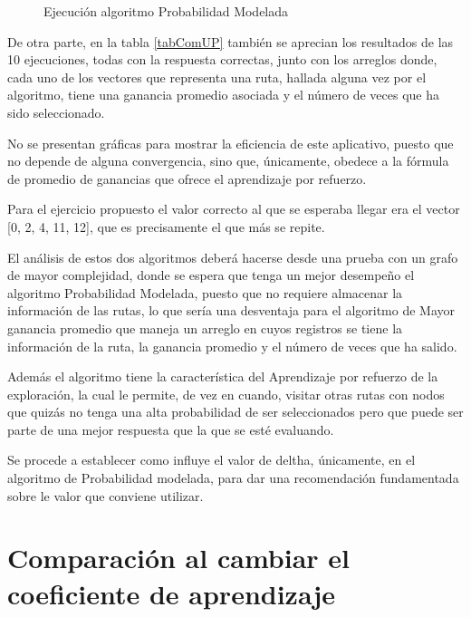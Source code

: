 \begin{figure}
\begin{subfigure}[b]{0.39\textwidth}
        \label{fig:tiger}
    \end{subfigure}    
    \caption{Ejecución algoritmo Probabilidad Modelada}\label{fig:grafi}
\end{figure}

De otra parte, en la tabla \ref{tabComUP} también se aprecian los resultados de las 10 ejecuciones, todas con la respuesta correctas, junto con los arreglos donde, cada uno de los vectores que representa una ruta, hallada alguna vez por el algoritmo, tiene una ganancia promedio asociada y el número de veces que ha sido seleccionado.

No se presentan gráficas para mostrar la eficiencia de este aplicativo, puesto que no depende de alguna convergencia, sino que, únicamente, obedece a la fórmula de promedio de ganancias que ofrece el aprendizaje por refuerzo.

Para el ejercicio propuesto el valor correcto al que se esperaba llegar era el vector [0, 2, 4, 11, 12], que es precisamente el que más se repite.

El análisis de estos dos algoritmos deberá hacerse desde una prueba con un grafo de mayor complejidad, donde se espera que tenga un mejor desempeño el algoritmo Probabilidad Modelada, puesto que no requiere almacenar la información de las rutas, lo que sería una desventaja para el algoritmo de Mayor ganancia promedio que maneja un arreglo en cuyos registros se tiene la información de la ruta, la ganancia promedio y el número de veces que ha salido.

Además el algoritmo tiene la característica del Aprendizaje por refuerzo de la exploración, la cual le permite, de vez en cuando, visitar otras rutas con nodos que quizás no tenga una alta probabilidad de ser seleccionados pero que puede ser parte de una mejor respuesta que la que se esté evaluando.

Se procede a establecer como influye el valor de deltha, únicamente, en el algoritmo de Probabilidad modelada, para dar una recomendación fundamentada sobre le valor que conviene utilizar.

\section{Comparación al cambiar el coeficiente de aprendizaje}


